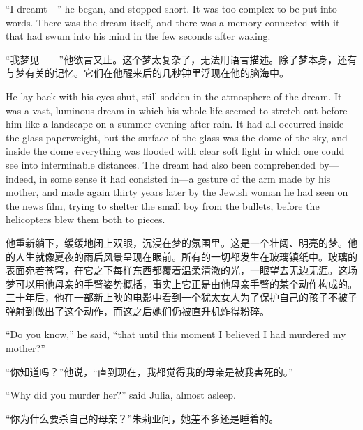 \begin{paracol}{2}
\switchcolumn*

``I dreamt---'' he began, and stopped short. It was too complex to be put
into words. There was the dream itself, and there was a memory connected
with it that had swum into his mind in the few seconds after waking.

\switchcolumn

``我梦见——''他欲言又止。这个梦太复杂了，无法用语言描述。除了梦本身，还有与梦有关的记忆。它们在他醒来后的几秒钟里浮现在他的脑海中。

\switchcolumn*

He lay back with his eyes shut, still sodden in the atmosphere of the
dream. It was a vast, luminous dream in which his whole life seemed to
stretch out before him like a landscape on a summer evening after rain.
It had all occurred inside the glass paperweight, but the surface of the
glass was the dome of the sky, and inside the dome everything was
flooded with clear soft light in which one could see into interminable
distances. The dream had also been comprehended by---indeed, in some
sense it had consisted in---a gesture of the arm made by his mother, and
made again thirty years later by the Jewish woman he had seen on the
news film, trying to shelter the small boy from the bullets, before the
helicopters blew them both to pieces.

\switchcolumn

他重新躺下，缓缓地闭上双眼，沉浸在梦的氛围里。这是一个壮阔、明亮的梦。他的人生就像夏夜的雨后风景呈现在眼前。所有的一切都发生在玻璃镇纸中。玻璃的表面宛若苍穹，在它之下每样东西都覆着温柔清澈的光，一眼望去无边无涯。这场梦可以用他母亲的手臂姿势概括，事实上它正是由他母亲手臂的某个动作构成的。三十年后，他在一部新上映的电影中看到一个犹太女人为了保护自己的孩子不被子弹射到做出了这个动作，而这之后她们仍被直升机炸得粉碎。

\switchcolumn*

``Do you know,'' he said, ``that until this moment I believed I had
murdered my mother?''

\switchcolumn

``你知道吗？''他说，``直到现在，我都觉得我的母亲是被我害死的。''

\switchcolumn*

``Why did you murder her?'' said Julia, almost asleep.

\switchcolumn

``你为什么要杀自己的母亲？''朱莉亚问，她差不多还是睡着的。

\switchcolumn*


\end{paracol}
